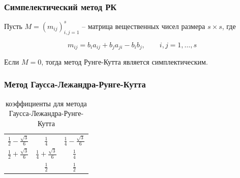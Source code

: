 \documentclass[t]{beamer}
\begin{document}
\begin{frame}
    \frametitle{Симпелектический метод РК}

    Пусть $M=\left( m_{ij} \right)^s_{i,j=1}$ -- матрица вещественных чисел размера
    $s\times s$, где
    \begin{block}{}
        \begin{equation*}
            m_{ij} = b_i a_{ij} + b_j a_{ji} - b_i b_j,\qquad i,j=1,\dots,s
        \end{equation*}
    \end{block}
    \begin{theorem}
        Если $M = 0$, тогда метод Рунге-Кутта является симплектическим.
    \end{theorem}
\end{frame}


\begin{frame}[c]
    \frametitle{Метод Гаусса-Лежандра-Рунге-Кутта}
    \begin{table}[h]
        \renewcommand{\arraystretch}{1.8}
        \centering
        \begin{tabular}{c|cc}
            $\frac12 - \frac{\sqrt3}6$ & $\frac14$                  & $\frac14 - \frac{\sqrt3}6$ \\
            $\frac12 + \frac{\sqrt3}6$ & $\frac14 + \frac{\sqrt3}6$ & $\frac14$ \\ \hline
                                       & $\frac12$                  & $\frac12$
        \end{tabular}
        \caption{коэффициенты для метода Гаусса-Лежандра-Рунге-Кутта}
    \end{table}
\end{frame}
\end{document}
